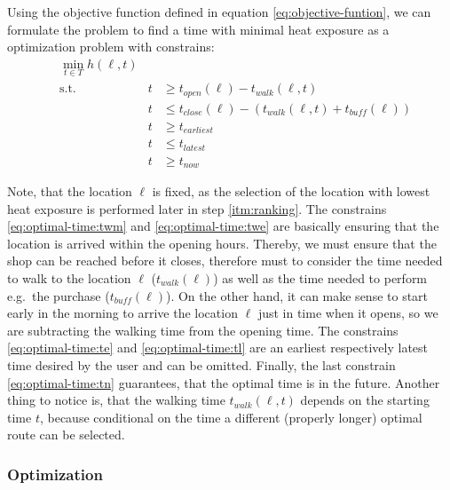 Using the objective function defined in equation \eqref{eq:objective-funtion}, we can formulate the problem to find a time with minimal heat exposure as a optimization problem with constrains:
\begin{subequations}
	\label{eq:optimal-time}
	\begin{alignat}{2}
	&\min_{t \in T} h(\ell, t) && \label{eq:optimal-time:of} \\
	&\text{s.t.} & t & \geq t_{open}(\ell)-t_{walk}(\ell, t) \label{eq:optimal-time:twm}\\
	&	& t & \leq   t_{close}(\ell)-(t_{walk}(\ell, t)+t_{buff}(\ell))	\label{eq:optimal-time:twe}\\
	&	&  t & \geq t_{earliest} \label{eq:optimal-time:te} \\
	&	&  t & \leq t_{latest} \label{eq:optimal-time:tl} \\
	&  & t  & \geq t_{now} \label{eq:optimal-time:tn} 
	\end{alignat}
\end{subequations}

Note, that the location $\ell$ is fixed, as the selection of the location with lowest heat exposure is performed later in step \ref{itm:ranking}. The constrains \eqref{eq:optimal-time:twm} and \eqref{eq:optimal-time:twe} are  basically ensuring that the location is arrived within the opening hours. Thereby, we must ensure that the shop can be reached before it closes, therefore must to consider the time needed to walk to the location $\ell$ ($t_{walk}(\ell)$) as well as the time needed to perform e.g.\ the purchase ($t_{buff}(\ell)$). On the other hand, it can make sense to start early in the morning to arrive the location $\ell$ just in time when it opens, so we are subtracting the walking time from the opening time. The constrains \eqref{eq:optimal-time:te} and \eqref{eq:optimal-time:tl} are an earliest respectively latest time desired by the user and can be omitted. Finally, the last constrain  \eqref{eq:optimal-time:tn}  guarantees, that the optimal time is in the future. Another thing to notice is, that the walking time $t_{walk}(\ell, t)$ depends on the starting time $t$, because conditional on the time a different (properly longer) optimal route can be selected.

 \subsubsection{Optimization \label{sec:optimization}}
 
